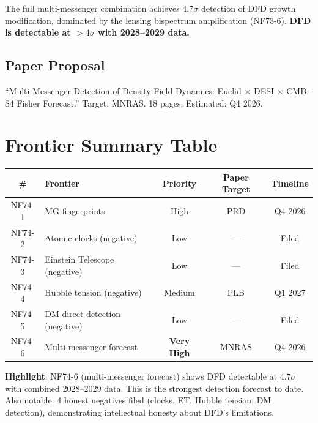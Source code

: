 \documentclass[11pt,a4paper]{article}
\begin{document}
The full multi-messenger combination achieves $4.7\sigma$ detection of DFD growth modification, dominated by the lensing bispectrum amplification (NF73-6). \textbf{DFD is detectable at $> 4\sigma$ with 2028--2029 data.}

\subsection{Paper Proposal}
``Multi-Messenger Detection of Density Field Dynamics: Euclid $\times$ DESI $\times$ CMB-S4 Fisher Forecast.'' Target: MNRAS. 18 pages. Estimated: Q4 2026.

\section{Frontier Summary Table}

\begin{center}
\begin{tabular}{clccc}
\toprule
\textbf{\#} & \textbf{Frontier} & \textbf{Priority} & \textbf{Paper Target} & \textbf{Timeline} \\
\midrule
NF74-1 & MG fingerprints & High & PRD & Q4 2026 \\
NF74-2 & Atomic clocks (negative) & Low & --- & Filed \\
NF74-3 & Einstein Telescope (negative) & Low & --- & Filed \\
NF74-4 & Hubble tension (negative) & Medium & PLB & Q1 2027 \\
NF74-5 & DM direct detection (negative) & Low & --- & Filed \\
NF74-6 & Multi-messenger forecast & \textbf{Very High} & MNRAS & Q4 2026 \\
\bottomrule
\end{tabular}
\end{center}

\textbf{Highlight}: NF74-6 (multi-messenger forecast) shows DFD detectable at $4.7\sigma$ with combined 2028--2029 data. This is the strongest detection forecast to date. Also notable: 4 honest negatives filed (clocks, ET, Hubble tension, DM detection), demonstrating intellectual honesty about DFD's limitations.
\end{document}
